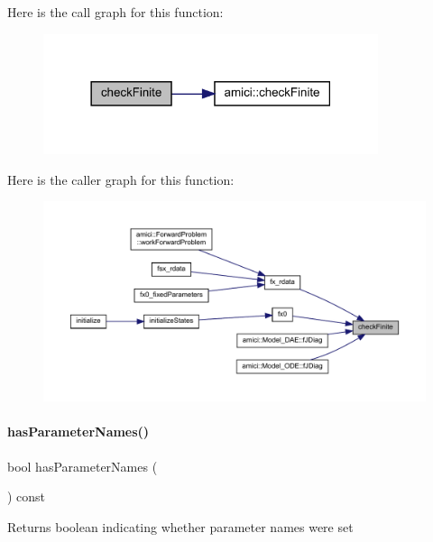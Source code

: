 Here is the call graph for this function\+:
\nopagebreak
\begin{figure}[H]
\begin{center}
\leavevmode
\includegraphics[width=278pt]{classamici_1_1_model_a4c38f5beea9e36aa20a089307edb5fed_cgraph}
\end{center}
\end{figure}
Here is the caller graph for this function\+:
\nopagebreak
\begin{figure}[H]
\begin{center}
\leavevmode
\includegraphics[width=350pt]{classamici_1_1_model_a4c38f5beea9e36aa20a089307edb5fed_icgraph}
\end{center}
\end{figure}
\mbox{\label{classamici_1_1_model_a7b51ed26a01b793c832fe680d9543763}} 
\paragraph{\texorpdfstring{hasParameterNames()}{hasParameterNames()}}
{\footnotesize\ttfamily bool has\+Parameter\+Names (\begin{DoxyParamCaption}{ }\end{DoxyParamCaption}) const\hspace{0.3cm}{\ttfamily [virtual]}}

\begin{DoxyReturn}{Returns}
boolean indicating whether parameter names were set 
\end{DoxyReturn}


